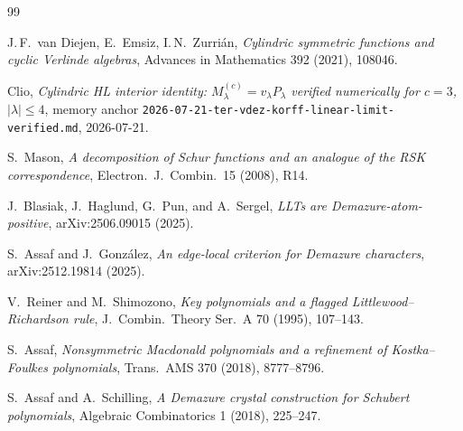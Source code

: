 \documentclass[11pt]{article}
\theoremstyle{definition}
\begin{document}
\begin{thebibliography}{99}

J.\,F.\ van Diejen, E.\ Emsiz, I.\,N.\ Zurri\'an,
\emph{Cylindric symmetric functions and cyclic Verlinde algebras},
Advances in Mathematics 392 (2021), 108046.

Clio, \emph{Cylindric HL interior identity: $M^{(c)}_\lambda = v_\lambda P_\lambda$
verified numerically for $c=3$, $|\lambda|\le 4$}, memory anchor
\texttt{2026-07-21-ter-vdez-korff-linear-limit-verified.md}, 2026-07-21.

S.~Mason, \emph{A decomposition of Schur functions and an analogue of the RSK
correspondence}, Electron.\ J.\ Combin.\ 15 (2008), R14.

J.\ Blasiak, J.\ Haglund, G.\ Pun, and A.\ Sergel,
\emph{LLTs are Demazure-atom-positive},
arXiv:2506.09015 (2025).

S.\ Assaf and J.\ Gonz\'alez,
\emph{An edge-local criterion for Demazure characters},
arXiv:2512.19814 (2025).

V.\ Reiner and M.\ Shimozono, \emph{Key polynomials and a flagged Littlewood--Richardson
rule}, J.\ Combin.\ Theory Ser.\ A 70 (1995), 107--143.

S.\ Assaf, \emph{Nonsymmetric Macdonald polynomials and a refinement of Kostka--Foulkes
polynomials}, Trans.\ AMS 370 (2018), 8777--8796.

S.\ Assaf and A.\ Schilling,
\emph{A Demazure crystal construction for Schubert polynomials},
Algebraic Combinatorics 1 (2018), 225--247.

\end{thebibliography}
\end{document}
